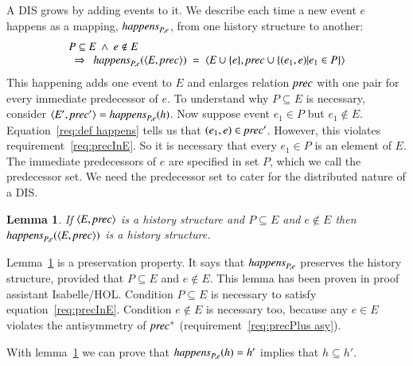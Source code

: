 \documentclass{elsarticle}
\newtheorem{lemma}{Lemma}
\def\id#1{\text{\em #1\/}}
\def\Events{{\mathit E}}
\begin{document}
	A DIS grows by adding events to it.
	We describe each time a new event $e$ happens as a mapping, $\id{happens}_{P,e}$, from one history structure to another:
\begin{equation}
\begin{array}[b]{l}
	P\subseteq\Events\ \wedge\ e\notin E\\
	\ \ \Rightarrow\ \ \id{happens}_{P,e}(\la \Events, \id{prec}\ra)\ =\ \la \Events\cup\{e\}, \id{prec}\cup\{(e_1,e) | e_1\in P\}\ra
\end{array}
\label{req:def happens}
\end{equation}
	This happening adds one event to $\Events$ and enlarges relation $\id{prec}$ with one pair for every immediate predecessor of $e$.
	To understand why $P\subseteq\Events$ is necessary,
	consider $\la \Events', \id{prec}'\ra=\id{happens}_{P,e}(h)$.
	Now suppose event $e_1\in P$ but $e_1\notin\Events$.
	Equation~\ref{req:def happens} tells us that $(e_1,e)\in\id{prec}'$.
	However, this violates requirement~\ref{req:precInE}.
	So it is necessary that every $e_1\in P$ is an element of $\Events$.
	The immediate predecessors of $e$ are specified in set $P$, which we call the predecessor set.
	We need the predecessor set to cater for the distributed nature of a DIS.
\begin{lemma}
\label{lemma:happens preserves history structure}
	If $\la \Events, \id{prec}\ra$ is a history structure and $P\subseteq\Events$ and $e\notin\Events$
	then $\id{happens}_{P,e}(\la \Events, \id{prec}\ra)$ is a history structure.
\end{lemma}
	Lemma~\ref{lemma:happens preserves history structure} is a preservation property.
	It says that $\id{happens}_{P,e}$ preserves the history structure,
	provided that $P\subseteq\Events$ and $e\notin\Events$.
	This lemma has been proven in proof assistant Isabelle/HOL.
	Condition $P\subseteq\Events$ is necessary to satisfy equation~\ref{req:precInE}.
	Condition $e\notin\Events$ is necessary too,
	because any $e\in\Events$ violates the antisymmetry of $\id{prec}^+$ (requirement~\ref{req:precPlus asy}).

	With lemma~\ref{lemma:happens preserves history structure} we can prove that $\id{happens}_{P,e}(h)=h'$ implies that $h\subseteq h'$.
\end{document}
